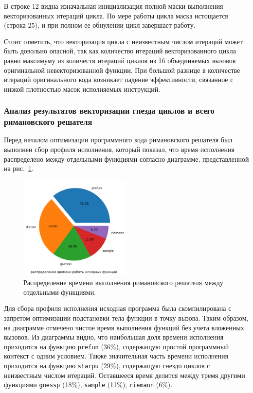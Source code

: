 В строке 12 видна изначальная инициализация полной маски выполнения векторизованных итераций цикла.
По мере работы цикла маска истощается (строка 25), и при полном ее обнулении цикл завершает работу.

Стоит отметить, что векторизация цикла с неизвестным числом итераций может быть довольно опасной, так как количество итераций векторизованного цикла равно максимуму из количеств итераций циклов из 16 объединяемых вызовов оригинальной невекторизованной функции.
При большой разнице в количестве итераций оригинального кода возникает падение эффективности, связанное с низкой плотностью масок\label{term:vector_mask_density4} исполняемых инструкций.

\subsubsection{Анализ результатов векторизации гнезда циклов и всего римановского решателя}

Перед началом оптимизации программного кода римановского решателя был выполнен сбор профиля исполнения\label{term:execution_profile2}, который показал, что время исполнения распределено между отдельными функциями согласно диаграмме, представленной на рис.~\ref{fig:text_4_vec_riem_exe_prof}.

\begin{figure}
\centering
\includegraphics[width=0.5\textwidth]{pics/text_4_vec_riemann/exe_prof.png}
\singlespacing
{}\caption{Распределение времени выполнения римановского решателя между отдельными функциями.}
\label{fig:text_4_vec_riem_exe_prof}
\end{figure}

Для сбора профиля исполнения исходная программа была скомпилирована с запретом оптимизации подстановки тела функции в точку вызова.
Таким образом, на диаграмме отмечено чистое время выполнения функций без учета вложенных вызовов.
Из диаграммы видно, что наибольшая доля времени исполнения приходится на функцию \texttt{prefun} (36\%), содержащую простой программный контекст с одним условием.
Также значительная часть времени исполнения приходится на функцию \texttt{starpu} (29\%), содержащую гнездо циклов с неизвестным числом итераций.
Оставшееся время делится между тремя другими функциями \texttt{guessp} (18\%), \texttt{sample} (11\%), \texttt{riemann} (6\%).

